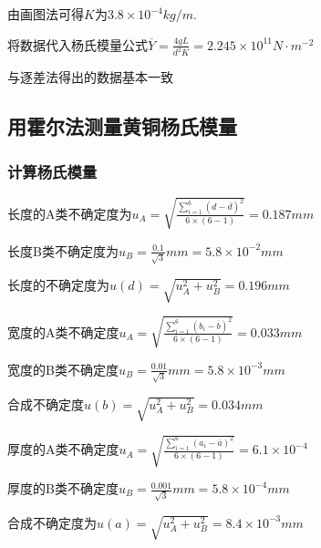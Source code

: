 \documentclass[12pt,a4paper]{article}
\begin{document}
    由画图法可得$K$为$ 3.8 \times {10^{ - 4}} kg/m$.\par
    将数据代入杨氏模量公式$\overline Y  = \frac{4gL}{{{d^2}K}} = 2.245 \times {10^{11}}N \cdot {m^{ - 2}}$\par
    与逐差法得出的数据基本一致

    \subsection{用霍尔法测量黄铜杨氏模量}
    \subsubsection{计算杨氏模量}
        长度的A类不确定度为${u_A} = \sqrt {\frac{{\sum\limits_{i = 1}^6 {{{\left( {d - \overline d } \right)}^2}} }}{{6 \times \left( {6 - 1} \right)}}}  = 0.187mm$\par
        长度B类不确定度为$ {u_B} = \frac{{0.1}}{{\sqrt 3 }}mm=5.8 \times {10^{ - 2}}mm$ \par
        长度的不确定度为$u\left( d \right) = \sqrt {u_A^2 + u_B^2}  = 0.196mm$\par
        宽度的A类不确定度${u_A} = \sqrt {\frac{{\sum\limits_{i = 1}^6 {{{\left( {{b_i} - \overline b } \right)}^2}} }}{{6 \times \left( {6 - 1} \right)}}}  = 0.033mm$\par
        宽度的B类不确定度${u_B} = \frac{{0.01}}{{\sqrt 3 }}mm = 5.8 \times {10^{ - 3}}mm$\par
        合成不确定度$u\left( b \right) = \sqrt {u_A^2 + u_B^2}  = 0.034mm$\par
        厚度的A类不确定度${u_A} = \sqrt {\frac{{\sum\limits_{i = 1}^6 {{{\left( {{a_i} - \overline a } \right)}^2}} }}{{6 \times \left( {6 - 1} \right)}}}  = 6.1 \times {10^{ - 4}}$\par
        厚度的B类不确定度${u_B} = \frac{{0.001}}{{\sqrt 3 }}mm = 5.8 \times {10^{ - 4}}mm$\par
        合成不确定度为$u\left( a \right) = \sqrt {u_A^2 + u_B^2}  = 8.4 \times {10^{ - 3}}mm$
\end{document}
